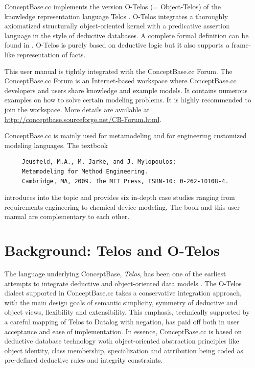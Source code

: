 ConceptBase.cc implements the version O-Telos (= Object-Telos)
of the knowledge representation language
Telos \cite{mbjk90}. O-Telos integrates a thoroughly axiomatized structurally
object-oriented kernel with a predicative assertion language in the style
of deductive databases. A complete formal definition can be found in
\cite{JIIS,jeus92}. O-Telos is purely based on deductive logic but it also
supports a frame-like representation of facts.

This user manual is tightly integrated with the ConceptBase.cc Forum. The ConceptBase.cc Forum is
an Internet-based workspace where ConceptBase.cc developers and users share knowledge
and example models.
It contains numerous examples on how to solve certain modeling problems. It is
highly recommended to join the workspace.
More details are available at
\url{http://conceptbase.sourceforge.net/CB-Forum.html}.

ConceptBase.cc is mainly used for metamodeling and for engineering customized
modeling languages. The textbook \cite{jjm09}

{\small
\begin{verbatim}
     Jeusfeld, M.A., M. Jarke, and J. Mylopoulos:
     Metamodeling for Method Engineering.
     Cambridge, MA, 2009. The MIT Press, ISBN-10: 0-262-10108-4.
\end{verbatim}
}

introduces into the topic and provides six in-depth case studies ranging from 
requirements engineering to chemical device modeling. The book and this
user manual are complementary to each other.



\section{Background: Telos and O-Telos}

The language underlying ConceptBase, {\em Telos}, has been
one of the earliest attempts to integrate deductive and object-oriented data models \cite{STAN86,mbjk90}.
The O-Telos \cite{jeus92} dialect supported in ConceptBase.cc takes a conservative integration approach, with the main design goals of
semantic simplicity, symmetry of deductive and object views, flexibility and extensibility.
This emphasis, technically supported by a careful mapping of Telos to Datalog
with negation, has paid off both in user acceptance
and ease of implementation. In essence, ConceptBase.cc is based on deductive database
technology woth object-oriented abstraction principles like object identity,
class membership, specialization and attribution being coded as pre-defined
deductive rules and integrity constraints.

